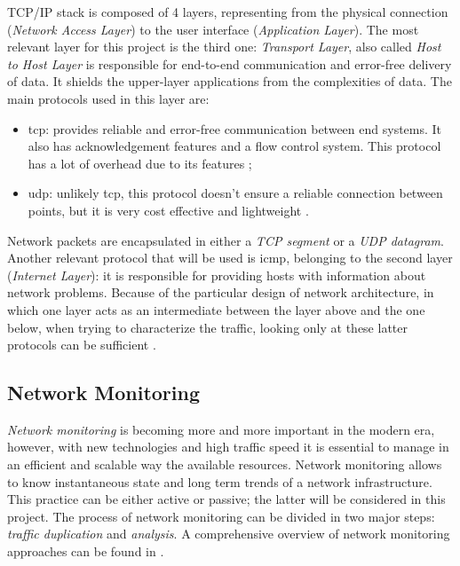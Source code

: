 \noindent TCP/IP stack is composed of 4 layers, representing from the physical connection (\textit{Network Access Layer}) to the user interface (\textit{Application Layer}). The most relevant layer for this project is the third one: \textit{Transport Layer}, also called \textit{Host to Host Layer} is responsible for end-to-end communication and error-free delivery of data. It shields the upper-layer applications from the complexities of data. The main protocols used in this layer are:

\begin{itemize}
    \item[\faCaretRight] \gls{tcp}: provides reliable and error-free communication between end systems. It also has acknowledgement features and a flow control system. This protocol has a lot of overhead due to its features \cite{Kurose2012};
    \item[\faCaretRight] \gls{udp}: unlikely \gls{tcp}, this protocol doesn't ensure a reliable connection between points, but it is very cost effective and lightweight \cite{Kurose2012}.
\end{itemize}
Network packets are encapsulated in either a \textit{TCP segment} or a \textit{UDP datagram}. Another relevant protocol that will be used is \gls{icmp}, belonging to the second layer (\textit{Internet Layer}): it is responsible for providing hosts with information about network problems. Because of the particular design of network architecture, in which one layer acts as an intermediate between the layer above and the one below, when trying to characterize the traffic, looking only at these latter protocols can be sufficient \cite{Iglesias2015}.


\subsection{Network Monitoring}
\label{subsec:network-monitoring}

\textit{Network monitoring} is becoming more and more important in the modern era, however, with new technologies and high traffic speed it is essential to manage in an efficient and scalable way the available resources. Network monitoring allows to know instantaneous state and long term trends of a network infrastructure. This practice can be either active or passive; the latter will be considered in this project. The process of network monitoring can be divided in two major steps: \textit{traffic duplication} and \textit{analysis}. A comprehensive overview of network monitoring approaches can be found in \cite{Svoboda2015}.


